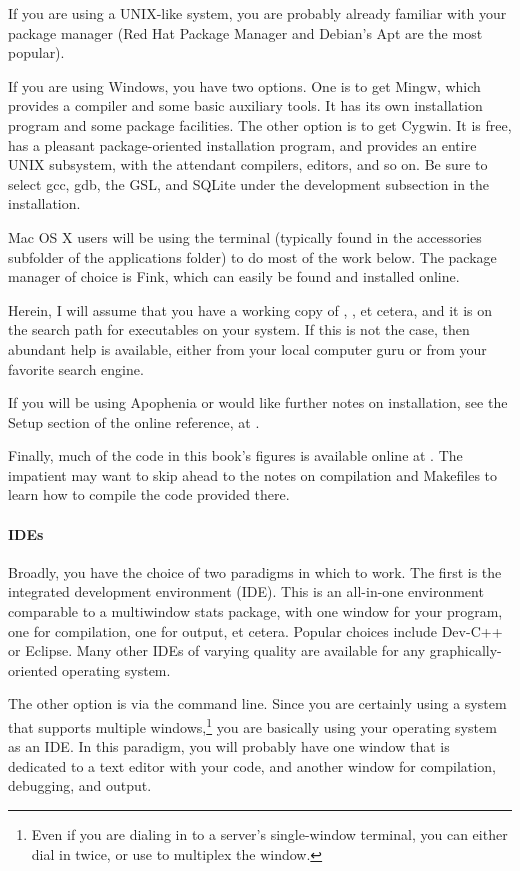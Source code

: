 If you are using a UNIX-like system, you are probably already familiar
with your package manager (Red Hat Package Manager and Debian's Apt are
the most popular).

If you are using Windows, you have two options. One is to get
Mingw, which provides a compiler and some basic auxiliary tools. It has its
own installation program and some package facilities. The other option is to
get Cygwin.  It is free, has a pleasant package-oriented installation
program, and provides an entire UNIX subsystem, with the attendant
compilers, editors, and so on. Be sure to select gcc, gdb, the GSL,
and SQLite under the development subsection in the installation.

Mac OS X users will be using the terminal (typically found in the
accessories subfolder of the applications folder) to do
most of the work below. The package manager of choice is Fink, which
can easily be found and installed online.

Herein, I will assume that you have a working copy of ,
, et cetera, and it is on the search path for executables
on your system. If this is not the case, then abundant help is available,
either from your local computer guru or from your favorite search engine.

If you will be using Apophenia or would like further notes on
installation, see the Setup section of the online reference, at
\onlinereflocation.


Finally, much of the code in this book's figures is available online at
\samplecodelocation. The impatient may want to skip ahead to the notes on
compilation and Makefiles to learn how to compile the code provided 
there.

\paragraph{IDEs}  
Broadly, you have the choice of two paradigms in which to work. The
first is the integrated development environment (IDE). This is an
all-in-one environment comparable to a multiwindow stats package, with
one window for your program, one for compilation, one for output, et
cetera.  
Popular choices include Dev-C++ or Eclipse. Many other IDEs of varying
quality are available for any graphically-oriented operating system.

The other option is via the command line. Since you are certainly using
a system that supports multiple windows,\footnote{Even if you are
dialing in to a server's single-window terminal, you can either dial in
twice, or use  to multiplex the window.} 
you are basically using your operating system as an IDE.
In this paradigm, you will probably have one window that is dedicated to
a text editor with your code, and another window for compilation,
debugging, and output.


